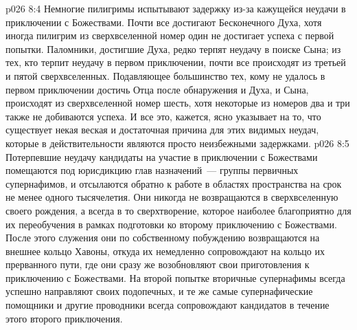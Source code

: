 \vs p026 8:4 \pc Немногие пилигримы испытывают задержку из\hyp{}за кажущейся неудачи в приключении с Божествами. Почти все достигают Бесконечного Духа, хотя иногда пилигрим из сверхвселенной номер один не достигает успеха с первой попытки. Паломники, достигшие Духа, редко терпят неудачу в поиске Сына; из тех, кто терпит неудачу в первом приключении, почти все происходят из третьей и пятой сверхвселенных. Подавляющее большинство тех, кому не удалось в первом приключении достичь Отца после обнаружения и Духа, и Сына, происходят из сверхвселенной номер шесть, хотя некоторые из номеров два и три также не добиваются успеха. И все это, кажется, ясно указывает на то, что существует некая веская и достаточная причина для этих видимых неудач, которые в действительности являются просто неизбежными задержками.
\vs p026 8:5 Потерпевшие неудачу кандидаты на участие в приключении с Божествами помещаются под юрисдикцию глав назначений~--- группы первичных супернафимов, и отсылаются обратно к работе в областях пространства на срок не менее одного тысячелетия. Они никогда не возвращаются в сверхвселенную своего рождения, а всегда в то сверхтворение, которое наиболее благоприятно для их переобучения в рамках подготовки ко второму приключению с Божествами. После этого служения они по собственному побуждению возвращаются на внешнее кольцо Хавоны, откуда их немедленно сопровождают на кольцо их прерванного пути, где они сразу же возобновляют свои приготовления к приключению с Божествами. На второй попытке вторичные супернафимы всегда успешно направляют своих подопечных, и те же самые супернафические помощники и другие проводники всегда сопровождают кандидатов в течение этого второго приключения.

